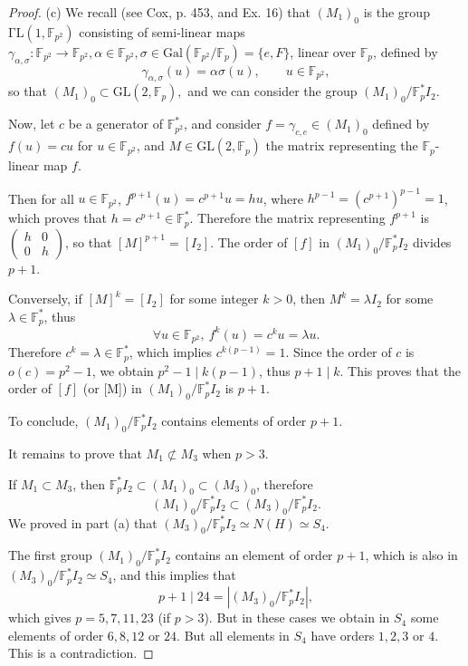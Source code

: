 \documentclass[11pt,a4paper]{article}
\newcommand{\F}{\mathbb{F}}
\newcommand{\Gal}{\mathrm{Gal}}
\begin{document}
{\begin{proof}
\item[(c)] We recall (see Cox, p. 453, and Ex. 16) that $(M_1)_0$ is the group $\mathrm{\Gamma L}(1,\F_{p^2})$ consisting of semi-linear maps $\gamma_{\alpha,\sigma} : \F_{p^2} \to \F_{p^2}, \alpha \in \F_{p^2}, \sigma \in \Gal(\F_{p^2}/\F_p) = \{e, F\}$, linear over $\F_p$, defined by
$$\gamma_{\alpha,\sigma}(u) = \alpha \sigma(u),\qquad u\in\F_{p^2},$$
so that $(M_1)_0 \subset \mathrm{GL}(2,\F_p),$ and we can consider the group $(M_1)_0/\F_p^* I_2$.

Now, let $c$ be a generator of $\F_{p^2}^*$, and consider $f = \gamma_{c,e} \in (M_1)_0$ defined by $f(u) = c u$ for $u\in \F_{p^2}$, and $M \in \mathrm{GL}(2,\F_p)$ the matrix representing the $\F_p$-linear map $f$.

Then for all $u \in \F_{p^2}$, $f^{p+1}(u) = c^{p+1} u = h u$, where $h^{p-1} = (c^{p+1})^{p-1} = 1$, which proves that $h = c^{p+1} \in \F_p^*$. Therefore the matrix representing $f^{p+1}$ is $\begin{pmatrix} h & 0 \\ 0 & h \end{pmatrix}$, so that $[M]^{p+1} = [I_2].$ The order of $[f]$ in $(M_1)_0/ \F_p^* I_2$ divides $p+1$.

Conversely, if $[M]^k = [I_2]$ for some integer $k >0$, then $M^k = \lambda I_2$ for some $\lambda \in \F_p^*$, thus
$$\forall u \in \F_{p^2},\ f^k(u) = c^k u = \lambda u.$$
Therefore $c^k = \lambda \in \F_p^*$, which implies $c^{k(p-1)} = 1$. Since the order of $c$ is $o(c) = p^2-1$, we obtain $p^2 - 1 \mid k(p-1)$, thus $p+1 \mid k$. This proves that the order of $[f]$ (or [M]) in $(M_1)_0/ \F_p^* I_2$ is $p+1$.

To conclude, $(M_1)_0/ \F_p^* I_2$ contains elements of order $p+1$.

\bigskip

It remains to prove that $M_1 \not \subset M_3$ when $p>3$.

If $M_1 \subset M_3$, then $\F_p^* I_2 \subset (M_1)_0 \subset (M_3)_0$, therefore 
$$(M_1)_0 / \F_p^* I_2 \subset (M_3)_0/ \F_p^*I_2.$$
We proved in part (a) that $(M_3)_0/ \F_p^* I_2 \simeq N(H) \simeq S_4$.

The first group $(M_1)_0 / \F_p^*I_2$ contains an element of order $p+1$, which is also in $(M_3)_0/ \F_p^* I_2\simeq S_4$, and this implies that
$$p+1 \mid 24 =  |(M_3)_0/ \F_p^* I_2|,$$
which gives $p = 5,7,11,23$ (if $p>3$). But in these cases we obtain in $S_4$ some elements of order $6,8,12$ or $24$. But all elements in $S_4$ have orders $1,2,3$ or $4$. This is a contradiction.


\end{proof}}
\end{document}
